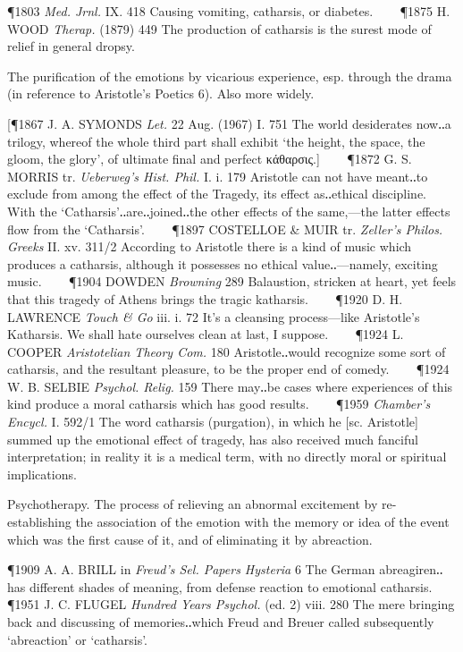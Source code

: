 \begin{description}[wide, labelwidth=!, labelindent=0pt]
\begin{myenumerate}
\P 1803  \textit{Med. Jrnl.} IX. 418 Causing vomiting, catharsis, or diabetes.    
\P 1875 H. WOOD  \textit{Therap.} (1879) 449 The production of catharsis is the surest mode of relief in general dropsy.

 The purification of the emotions by vicarious experience, esp. through the drama (in reference to Aristotle's Poetics 6). Also more widely.

[\P 1867 J. A. SYMONDS  \textit{Let.} 22 Aug. (1967) I. 751 The world desiderates now‥a trilogy, whereof the whole third part shall exhibit ‘the height, the space, the gloom, the glory’, of ultimate final and perfect κάθαρσις.]    
\P 1872 G. S. MORRIS tr. \textit{Ueberweg's Hist. Phil.} I. i. 179 Aristotle can not have meant‥to exclude from among the effect of the Tragedy, its effect as‥ethical discipline. With the ‘Catharsis’‥are‥joined‥the other effects of the same,—the latter effects flow from the ‘Catharsis’.    
\P 1897 COSTELLOE  \& MUIR tr. \textit{Zeller's Philos. Greeks} II. xv. 311/2 According to Aristotle there is a kind of music which produces a catharsis, although it possesses no ethical value‥—namely, exciting music.    
\P 1904 DOWDEN  \textit{Browning} 289 Balaustion, stricken at heart, yet feels that this tragedy of Athens brings the tragic katharsis.    
\P 1920 D. H. LAWRENCE  \textit{Touch \& Go} iii. i. 72 It's a cleansing process—like Aristotle's Katharsis. We shall hate ourselves clean at last, I suppose.    
\P 1924 L. COOPER  \textit{Aristotelian Theory Com.} 180 Aristotle‥would recognize some sort of catharsis, and the resultant pleasure, to be the proper end of comedy.    
\P 1924 W. B. SELBIE  \textit{Psychol. Relig.} 159 There may‥be cases where experiences of this kind produce a moral catharsis which has good results.    
\P 1959 \textit{Chamber's  Encycl.} I. 592/1 The word catharsis (purgation), in which he [sc. Aristotle] summed up the emotional effect of tragedy, has also received much fanciful interpretation; in reality it is a medical term, with no directly moral or spiritual implications.

 Psychotherapy. The process of relieving an abnormal excitement by re-establishing the association of the emotion with the memory or idea of the event which was the first cause of it, and of eliminating it by abreaction.

\P 1909 A. A. BRILL in \textit{Freud's Sel. Papers Hysteria} 6 The German abreagiren‥has different shades of meaning, from defense reaction to emotional catharsis.    
\P 1951 J. C. FLUGEL  \textit{Hundred Years Psychol.} (ed. 2) viii. 280 The mere bringing back and discussing of memories‥which Freud and Breuer called subsequently ‘abreaction’ or ‘catharsis’.
\end{myenumerate}



\end{description}

